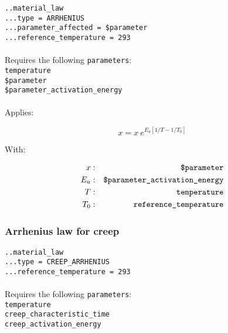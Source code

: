 \documentclass[10pt]{article}
\begin{document}
\noindent \verb+..material_law+\\
\verb+...type = ARRHENIUS+\\
\verb+...parameter_affected = $parameter+\\
\verb+...reference_temperature = 293+

\paragraph{}Requires the following \verb+parameters+:\\

\noindent \verb+temperature+\\
\verb+$parameter+\\
\verb+$parameter_activation_energy+

\paragraph{}Applies:

\begin{equation}
	x = x\ e^{E_a \left[ 1/T - 1/T_0 \right]}
\end{equation}

With:

\begin{eqnarray}
	x & : & \verb+$parameter+ \notag \\
	E_a & : & \verb+$parameter_activation_energy+\notag  \\
	T & : & \verb+temperature+ \notag \\
	T_0 & : & \verb+reference_temperature+ \notag 
\end{eqnarray}

\subsubsection{Arrhenius law for creep}

\noindent \verb+..material_law+\\
\verb+...type = CREEP_ARRHENIUS+\\
\verb+...reference_temperature = 293+

\paragraph{}Requires the following \verb+parameters+:\\

\noindent \verb+temperature+\\
\verb+creep_characteristic_time+\\
\verb+creep_activation_energy+
\end{document}

